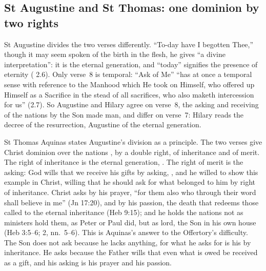\subsection{St Augustine and St Thomas: one dominion by two rights}
\label{sec:lamb-two-rights}

St Augustine divides the two verses differently. ``To-day have I begotten
Thee,'' though it may seem spoken of the birth in the flesh, he gives ``a
divine interpretation'': it is the eternal generation, and ``today'' signifies
the presence of eternity ( 2.6). Only verse~8 is
temporal: ``Ask of Me'' ``has at once a temporal sense with reference to the
Manhood which He took on Himself, who offered up Himself as a Sacrifice in the
stead of all sacrifices, who also maketh intercession for us'' (2.7). So
Augustine and Hilary agree on verse~8, the asking and receiving of the nations
by the Son made man, and differ on verse~7: Hilary reads the decree of the
resurrection, Augustine of the eternal generation.

St Thomas Aquinas states Augustine's division as a principle. The two verses
give Christ dominion over the nations , by a double right, of inheritance and of merit.
The right of inheritance is the eternal generation, . The right of merit is the asking: God wills that we
receive his gifts by asking, , and
he willed to show this example in Christ, willing that he should ask for what
belonged to him by right of inheritance. Christ asks by his prayer, ``for them
also who through their word shall believe in me'' (Jn 17:20), and by his
passion, the death that redeems those called to the eternal inheritance (Heb
9:15); and he holds the nations not as ministers hold them, as Peter or Paul
did, but as lord, the Son in his own house (Heb 3:5--6;  2, nn.~5--6). This is Aquinas's answer to the Offertory's
difficulty. The Son does not ask because he lacks anything, for what he asks
for is his by inheritance. He asks because the Father wills that even what is
owed be received as a gift, and his asking is his prayer and his passion.

